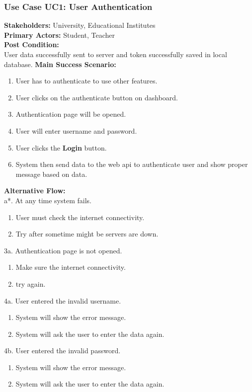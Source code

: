 \documentclass[12pt]{article}
\begin{document}
\subsubsection{Use Case UC1: User Authentication}
\textbf{Stakeholders: } University, Educational Institutes \\
\textbf{Primary Actors: } Student, Teacher \\
\textbf{Post Condition: }\\
User data successfully sent to server and token successfully saved in local database.
\newpage
\textbf{Main Success Scenario: }
\begin{enumerate}
\item User has to authenticate to use other features.
\item User clicks on the authenticate button on dashboard.
\item Authentication page will be opened.
\item User will enter username and password.
\item User clicks the \textbf{Login} button.
\item System then send data to the web api to authenticate user and show proper message based on data. 
\end{enumerate}
\textbf{Alternative Flow: }\\
a*. At any time system fails.
\begin{enumerate}
\item User must check the internet connectivity.
\item Try after sometime might be servers are down.
\end{enumerate}
3a. Authentication page is not opened.
\begin{enumerate}
\item Make sure the internet connectivity.
\item try again.
\end{enumerate}
4a. User entered the invalid username.
\begin{enumerate}
\item System will show the error message.
\item System will ask the user to enter the data again.
\end{enumerate}
4b. User entered the invalid password.
\begin{enumerate}
\item System will show the error message.
\item System will ask the user to enter the data again.
\end{enumerate}
\end{document}
